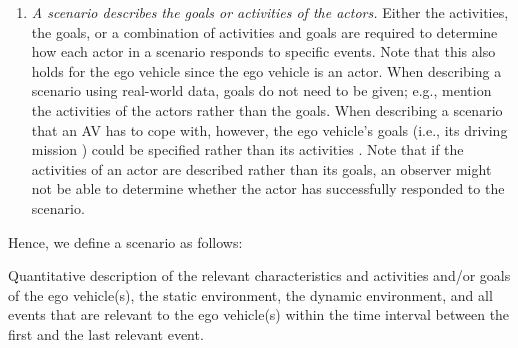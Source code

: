 \begin{enumerate}
	
	\item\textit{A scenario describes the goals or activities of the \cstartb actors.\cendb}
	\cstartb Either the activities, the goals, or a combination of activities and goals are required to determine \cendb\cstartd how each actor in a scenario responds to specific events. \cendd
	Note that this also holds for the ego vehicle since the ego vehicle is an actor.
	\cstarte When describing a scenario using real-world data, goals do not need to be given; e.g., \cende \textcite{elrofai2016scenario} mention the activities of the \cstartb actors \cendb rather than the goals. When describing a scenario that an AV has to cope with, however, the ego vehicle's goals (i.e., its driving mission \autocite{geyer2014}) could be specified rather than its activities \autocite{ulbrich2015}. Note that if the activities of \cstartb an actor \cendb are described rather than its goals, an observer might not be able to determine whether the \cstartb actor \cendb has successfully responded to the scenario.
\end{enumerate}


Hence, we define a scenario as follows:
\begin{definition}[Scenario]\label{def:scenario}
	\cstartd Quantitative description of the relevant characteristics and activities and/or goals of the ego vehicle(s), the static environment, the dynamic environment, and all events that are relevant to the ego vehicle(s) within the time interval between the first and the last relevant event. \cendd
\end{definition}



